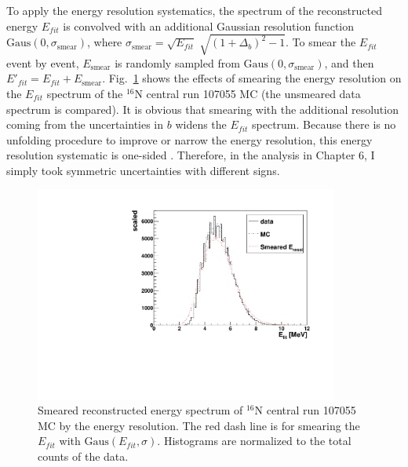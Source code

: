 To apply the energy resolution systematics, the spectrum of the reconstructed energy $E_{fit}$ is convolved with an additional Gaussian resolution function $\mathrm{Gaus}(0,\sigma_\mathrm{smear})$, where $\sigma_\mathrm{smear}=\sqrt{E_{fit}} \; \sqrt{(1+\Delta_{b})^2-1}$. To smear the $E_{fit}$ event by event, $E_\mathrm{smear}$ is randomly sampled from $\mathrm{Gaus}(0,\sigma_\mathrm{smear})$, and then $E'_{fit}=E_{fit}+E_\mathrm{smear}$. Fig.~\ref{fig:EresolSmear} shows the effects of smearing the energy resolution on the $E_{fit}$ spectrum of the $^{16}$N central run 107055 MC (the unsmeared data spectrum is compared). It is obvious that smearing with the additional resolution coming from the uncertainties in $b$ widens the $E_{fit}$ spectrum. Because there is no unfolding procedure to improve or narrow the energy resolution, this energy resolution systematic is one-sided \cite{marzec2019measurement}. Therefore, in the analysis in Chapter 6, I simply took symmetric uncertainties with different signs.
\begin{figure}
	\centering
	\includegraphics[width=10cm]{SmearedEresol_N16_new.pdf}
	\caption[Smeared reconstructed energy spectrum of $^{16}$N central run 107055 MC by the energy resolution.]{Smeared reconstructed energy spectrum of $^{16}$N central run 107055 MC by the energy resolution. The red dash line is for smearing the $E_{fit}$ with $\mathrm{Gaus}(E_{fit},\sigma)$. Histograms are normalized to the total counts of the data.\label{fig:EresolSmear}}
\end{figure}
